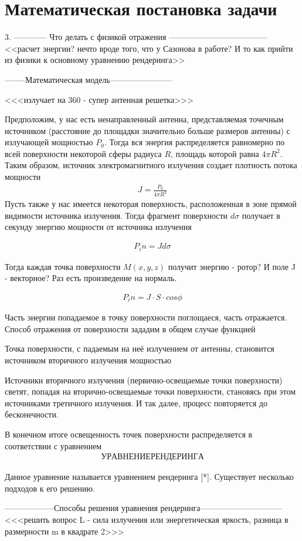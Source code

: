 \section*{Математическая постановка задачи}



3. ------------ Что делать с физикой отражения ------------------------------------
<<расчет энергии? нечто вроде того, что у Сазонова в работе? И то как прийти из физики к основному уравнению рендеринга>>


--------Математическая модель-----------------------

<<<излучает на 360 - супер антенная решетка>>>

Предположим, у нас есть ненаправленный антенна, представляемая точечным источником (расстояние до площадки значительно больше размеров антенны) с излучающей мощностью $P_0$. Тогда вся энергия распределяется равномерно по всей поверхности некоторой сферы радиуса $R$, площадь которой равна $ 4 \pi R^2 $. Таким образом, источник электромагнитного излучения создает плотность потока мощности
\begin{gather}
   J = \frac{P_0}{4 \pi R^2}
\end{gather}
Пусть также у нас имеется некоторая поверхность, расположенная в зоне прямой видимости источника излучения.
Тогда фрагмент поверхности $d\sigma$ получает в секунду энергию мощности от источника излучения

\begin{gather}
  P_in = J  d\sigma
\end{gather}

Тогда каждая точка поверхности $ M(x, y, z) $ получит энергию - ротор?
И поле J - векторное? Раз есть произведение на нормаль.

\begin{gather}
   P_in = J \cdot S \cdot cos \phi
\end{gather}


Часть энергии попадаемое в точку поверхности поглощаеся, часть отражается. Способ отражения от поверхности зададим в общем случае функцией 

Точка поверхности, с падаемым на неё излучением от антенны, становится источником вторичного излучения мощностью

Источники вторичного излучения (первично-освещаемые точки поверхности) светят, попадая на вторично-освещаемые точки поверхности, становясь при этом источниками третичного излучения. И так далее, процесс повторяется до бесконечности. 

В конечном итоге освещенность точек поверхности распределяется в соответствии с уравнением
\begin{gather}
   УРАВНЕНИЕ РЕНДЕРИНГА
\end{gather}

Данное уравнение называется уравнением рендеринга [*]. Существует несколько подходов к его решению.


------------------Способы решения уравнения рендеринга------------------------------
<<<решить вопрос L - сила излучения или энергетическая яркость, разница в размерности m в квадрате 2>>>

